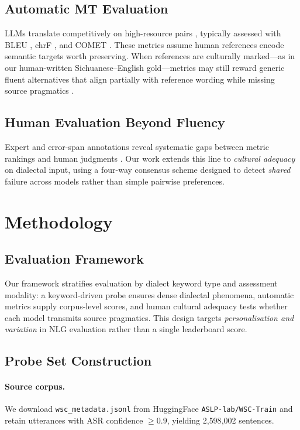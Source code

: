 \documentclass[11pt]{article}
\begin{document}
\subsection{Automatic MT Evaluation}
LLMs translate competitively on high-resource pairs \cite{hendy-etal-2023-mt}, typically assessed with BLEU \cite{post-2018-sacrebleu}, chrF \cite{popovic-2015-chrf}, and COMET \cite{rei-etal-2022-comet}.
These metrics assume human references encode semantic targets worth preserving.
When references are culturally marked---as in our human-written Sichuanese--English gold---metrics may still reward generic fluent alternatives that align partially with reference wording while missing source pragmatics \cite{freitag-etal-2021-bleu}.

\subsection{Human Evaluation Beyond Fluency}
Expert and error-span annotations reveal systematic gaps between metric rankings and human judgments \cite{freitag-etal-2021-bleu}.
Our work extends this line to \emph{cultural adequacy} on dialectal input, using a four-way consensus scheme designed to detect \emph{shared} failure across models rather than simple pairwise preferences.

\section{Methodology}

\subsection{Evaluation Framework}
Our framework stratifies evaluation by dialect keyword type and assessment modality: a keyword-driven probe ensures dense dialectal phenomena, automatic metrics supply corpus-level scores, and human cultural adequacy tests whether each model transmits source pragmatics.
This design targets \emph{personalisation and variation} in NLG evaluation rather than a single leaderboard score.

\subsection{Probe Set Construction}

\paragraph{Source corpus.}
We download \texttt{wsc\_metadata.jsonl} from HuggingFace \texttt{ASLP-lab/WSC-Train} \cite{wenetspeech-chuan} and retain utterances with ASR confidence $\geq 0.9$, yielding 2{,}598{,}002 sentences.
\end{document}
